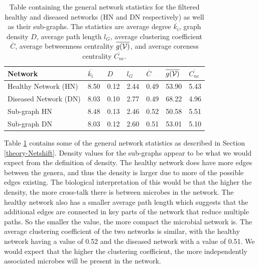 \begin{table}[!bt]
\centering
\begin{tabular}{l l l l l l l}
  \toprule
 Network & $\overline{k_i}$ & $D$ & $l_G$ & $\overline{C}$ & $\overline{g ( \mathcal{V} )}$  & $\overline{C_{nc}}$ \\ 
  \midrule
Healthy Network (HN) & 8.50 & 0.12 & 2.44 & 0.49 & 53.90 & 5.43 \\ 
  Diseased Network (DN) & 8.03 & 0.10 & 2.77 & 0.49 & 68.22 & 4.96 \\ 
  Sub-graph HN & 8.48 & 0.13 & 2.46 & 0.52 & 50.58 & 5.51 \\ 
  Sub-graph DN & 8.03 & 0.12 & 2.60 & 0.51 & 53.01 & 5.10 \\ 
   \bottomrule
\end{tabular}
\caption[Table containing the general network statistics for the filtered healthy and diseased networks (HN and DN respectively) as well as their sub-graphs.]{Table containing the general network statistics for the filtered healthy and diseased networks (HN and DN respectively) as well as their sub-graphs. The statistics are average degree $\overline{k_i}$,  graph density $D$, average path length $l_G$, average clustering coefficient $\overline{C}$, average betweenness centrality $\overline{g ( \mathcal{V} )}$, and average coreness centrality $\overline{C_{nc}}$. }
\label{tab:netstats}
\end{table}
Table \ref{tab:netstats} contains some of the general network statistics as described in Section \ref{theory-Netshift}. Density values for the sub-graphs appear to be what we would expect from the definition of density. The healthy network does have more edges between the genera, and thus the density is larger due to more of the possible edges existing. The biological interpretation of this would be that the higher the density, the more cross-talk there is between microbes in the network. The healthy network also has a smaller average path length which suggests that the additional edges are connected in key parts of the network that reduce multiple paths. So the smaller the value, the more compact the microbial network is. The average clustering coefficient of the two networks is similar, with the healthy network having a value of 0.52 and the diseased network with a value of 0.51. We would expect that the higher the clustering coefficient, the more independently associated microbes will be present in the network.

